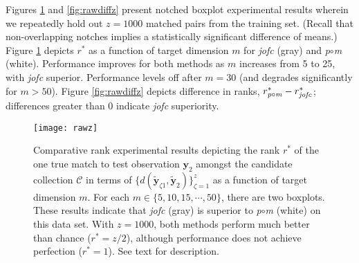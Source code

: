 \documentclass[12pt,xcolor]{article}
\newcommand{\1}{\ensuremath{\mbox{{\bf 1}}}}
\newcommand{\mC}{\mathcal{C}}
\begin{document}
\begin{comment}
a paragraph about the results once I get the exact pictures we will use.

\begin{figure}[h]
\begin{center}
\texttt{[image: paired10]}
\caption{
Comparative reciprocal rank experimental results indicating {\em jofc} is superior to {\it p}$\circ${\it m}. See text for description.
}\label{fig:exppaired}
\end{center}
\end{figure}

\end{comment}

Figures \ref{fig:rawz} and \ref{fig:rawdiffz} present notched boxplot experimental results
wherein we repeatedly hold out $z=1000$ matched pairs from the training set.
(Recall that non-overlapping notches implies a statistically significant difference of means.)
Figure \ref{fig:rawz} depicts $r^*$ as a function of target dimension $m$
for {\em jofc} (gray) and {\it p}$\circ${\it m} (white).
Performance improves for both methods as $m$ increases from 5 to 25, with {\em jofc} superior.
Performance levels off after $m=30$
(and degrades significantly for $m>50$).
Figure \ref{fig:rawdiffz} depicts difference in ranks,
$r^*_{\protect{{\it p}\circ{\it m}}} - r^*_{\protect{\it jofc}}$;
differences greater than 0 indicate {\em jofc} superiority.

\begin{comment}
\begin{figure}[h]
\begin{center}
\texttt{[image: raw]}
\caption{
Comparative rank experimental results depicting
the {\em rank} $r^*$ of the one true match
as a function of target dimension $d$.
(For each $d \in \{5,10,15,\cdots,50\}$, there are two boxplots.)
These results indicate that {\em jofc} (gray) is superior to {\it p}$\circ${\it m} (white) on this data set.
With $z=1000$, both methods perform much better than chance ($r^*=z/2$),
although performance does not achieve perfection ($r^*=1$).
See text for description.
}\label{fig:raw}
\end{center}
\end{figure}
\end{comment}

\begin{figure}[h]
\begin{center}
\texttt{[image: rawz]}
\caption{
Comparative rank experimental results
depicting the rank $r^*$
of the one true match to test observation $\bm{y}_{2}$
amongst the candidate collection $\mC$
in terms of $\{d(\widetilde{\bm{y}}_{\zeta1},\widetilde{\bm{y}}_{2})\}_{\zeta=1}^z$
as a function of target dimension $m$.
For each $m \in \{5,10,15,\cdots,50\}$, there are two boxplots.
These results indicate that {\em jofc} (gray) is superior to {\it p}$\circ${\it m} (white) on this data set.
With $z=1000$, both methods perform much better than chance ($r^*=z/2$),
although performance does not achieve perfection ($r^*=1$).
See text for description.
}\label{fig:rawz}
\end{center}
\end{figure}
\end{document}
